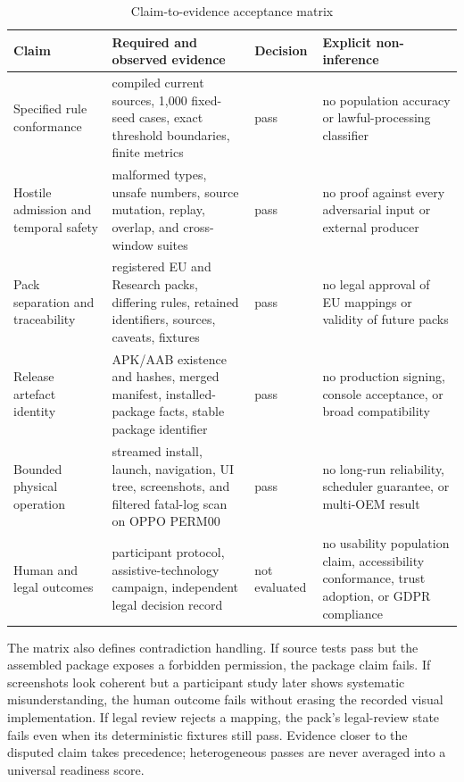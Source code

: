 \begin{table}[H]
\centering
\scriptsize
\caption{Claim-to-evidence acceptance matrix}
\label{tab:claim-evidence-matrix}
\begin{tabular}{@{}>{\raggedright\arraybackslash}p{}>{\raggedright\arraybackslash}p{}>{\raggedright\arraybackslash}p{}>{\raggedright\arraybackslash}p{}@{}}
\toprule
Claim & Required and observed evidence & Decision & Explicit non-inference \\
\midrule
Specified rule conformance & compiled current sources, 1,000 fixed-seed cases, exact threshold boundaries, finite metrics & pass & no population accuracy or lawful-processing classifier \\
Hostile admission and temporal safety & malformed types, unsafe numbers, source mutation, replay, overlap, and cross-window suites & pass & no proof against every adversarial input or external producer \\
Pack separation and traceability & registered EU and Research packs, differing rules, retained identifiers, sources, caveats, fixtures & pass & no legal approval of EU mappings or validity of future packs \\
Release artefact identity & APK/AAB existence and hashes, merged manifest, installed-package facts, stable package identifier & pass & no production signing, console acceptance, or broad compatibility \\
Bounded physical operation & streamed install, launch, navigation, UI tree, screenshots, and filtered fatal-log scan on OPPO PERM00 & pass & no long-run reliability, scheduler guarantee, or multi-OEM result \\
Human and legal outcomes & participant protocol, assistive-technology campaign, independent legal decision record & not evaluated & no usability population claim, accessibility conformance, trust adoption, or GDPR compliance \\
\bottomrule
\end{tabular}
\end{table}

The matrix also defines contradiction handling. If source tests pass but the assembled package exposes a forbidden permission, the package claim fails. If screenshots look coherent but a participant study later shows systematic misunderstanding, the human outcome fails without erasing the recorded visual implementation. If legal review rejects a mapping, the pack's legal-review state fails even when its deterministic fixtures still pass. Evidence closer to the disputed claim takes precedence; heterogeneous passes are never averaged into a universal readiness score.

